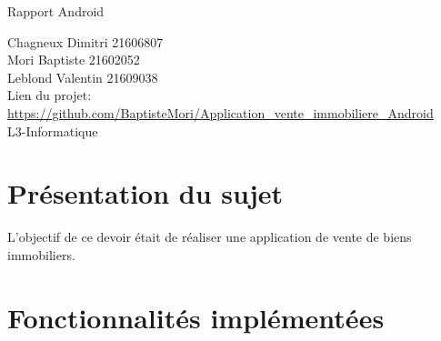 \documentclass[a4paper,12pt]{article} %
\begin{document}


\begin{titlepage}

\vspace{7cm}

\begin{center}

\begin{Huge}
Rapport Android\\
\end{Huge}
\vspace{2cm}
\begin{large}
Chagneux Dimitri 21606807\\
Mori Baptiste 21602052\\
Leblond Valentin 21609038\\
\vspace{1cm}
Lien du projet:\\
\url{https://github.com/BaptisteMori/Application_vente_immobiliere_Android}\\
\vspace{1cm}
L3-Informatique
\end{large}

\end{center}
\end{titlepage}



\newpage

\tableofcontents

\newpage



\section{Présentation du sujet}

L'objectif de ce devoir était de réaliser une application de vente de biens immobiliers.

\section{Fonctionnalités implémentées}
\end{document}
